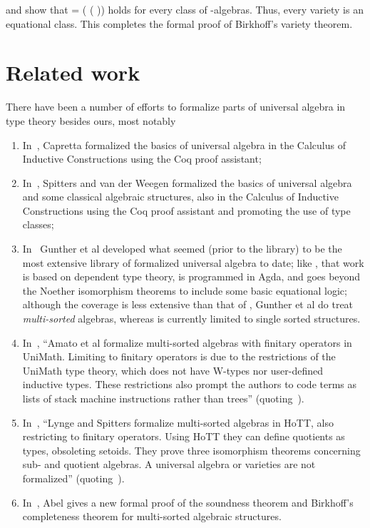  and  show that
  =  ( ( )) holds for every class  of -algebras.
Thus, every variety is an equational class. This completes the formal proof of Birkhoff's variety theorem.

\section{Related work}
There have been a number of efforts to formalize parts of universal algebra in
type theory besides ours, most notably

\begin{enumerate}
\item
In~\cite{Capretta:1999}, Capretta formalized the basics of universal algebra in the
   Calculus of Inductive Constructions using the Coq proof assistant;
\item In~\cite{Spitters:2011}, Spitters and van der Weegen formalized the basics of universal algebra
   and some classical algebraic structures, also in the Calculus of Inductive Constructions using
   the Coq proof assistant and promoting the use of type classes;
\item In~\cite{Gunther:2018} Gunther et al developed what seemed (prior to the \agdaalgebras library) to be
   the most extensive library of formalized universal algebra to date; like \agdaalgebras, that work is based on dependent type theory, is programmed in Agda, and goes beyond the Noether isomorphism theorems to include some basic equational logic; although the coverage is less extensive than that of \agdaalgebras, Gunther et al do treat \emph{multi-sorted} algebras, whereas \agdaalgebras is currently limited to single sorted structures.
   \item In~\cite{Amato:2021}, ``Amato et al formalize multi-sorted algebras with finitary operators in UniMath. Limiting to finitary operators is due to the restrictions of the UniMath type theory, which does not have W-types nor user-defined inductive types. These restrictions also prompt the authors to code terms as lists of stack machine instructions rather than trees'' (quoting~\cite{Abel:2021}).
\item In~\cite{Lynge:2019}, ``Lynge and Spitters formalize multi-sorted algebras in HoTT, also restricting to finitary operators. Using HoTT they can define quotients as types, obsoleting setoids. They prove three isomorphism theorems concerning sub- and quotient algebras. A universal algebra or varieties are not formalized'' (quoting~\cite{Abel:2021}).
\item In~\cite{Abel:2021}, Abel gives a new formal proof of the soundness theorem and Birkhoff's completeness theorem for multi-sorted algebraic structures.
\end{enumerate}

